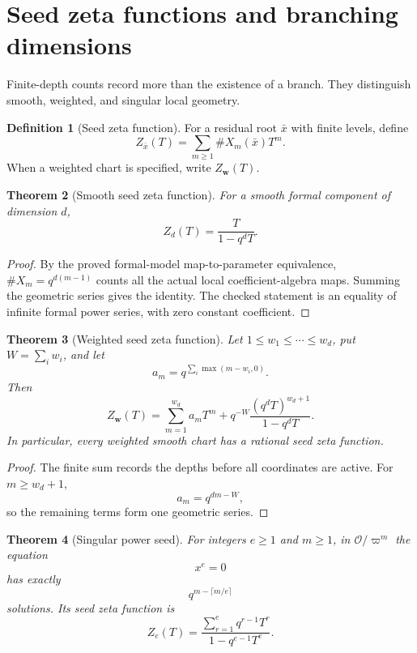 \documentclass[11pt]{article}
\newtheorem{theorem}{Theorem}[section]
\theoremstyle{definition}
\newtheorem{definition}[theorem]{Definition}
\theoremstyle{remark}
\newcommand{\Ocal}{\mathcal O}
\begin{document}
\section{Seed zeta functions and branching dimensions}

Finite-depth counts record more than the existence of a branch.  They distinguish smooth, weighted, and singular local geometry.

\begin{definition}[Seed zeta function]
For a residual root \(\bar x\) with finite levels, define
\[
\boxed{
Z_{\bar x}(T)
=
\sum_{m\ge1}\#X_m(\bar x)T^m.
}
\]
When a weighted chart is specified, write \(Z_{\bm w}(T)\).
\end{definition}

\begin{theorem}[Smooth seed zeta function]
For a smooth formal component of dimension \(d\),
\[
\boxed{
Z_d(T)=\frac{T}{1-q^dT}.
}
\]
\end{theorem}

\begin{proof}
By the proved formal-model map-to-parameter equivalence, \(\#X_m=q^{d(m-1)}\) counts all the actual local coefficient-algebra maps. Summing the geometric series gives the identity. The checked statement is an equality of infinite formal power series, with zero constant coefficient.
\end{proof}

\begin{theorem}[Weighted seed zeta function]
Let \(1\le w_1\le\cdots\le w_d\), put \(W=\sum_iw_i\), and let
\[
a_m=q^{\sum_i\max(m-w_i,0)}.
\]
Then
\[
\boxed{
Z_{\bm w}(T)
=
\sum_{m=1}^{w_d}a_mT^m
+
q^{-W}\frac{(q^dT)^{w_d+1}}{1-q^dT}.
}
\]
In particular, every weighted smooth chart has a rational seed zeta function.
\end{theorem}

\begin{proof}
The finite sum records the depths before all coordinates are active.  For \(m\ge w_d+1\),
\[
a_m=q^{dm-W},
\]
so the remaining terms form one geometric series.
\end{proof}

\begin{theorem}[Singular power seed]
For integers \(e\ge1\) and \(m\ge1\), in \(\Ocal/\varpi^m\) the equation
\[
x^e=0
\]
has exactly
\[
\boxed{
q^{m-\lceil m/e\rceil}
}
\]
solutions.  Its seed zeta function is
\[
\boxed{
Z_e(T)
=
\frac{\sum_{r=1}^{e}q^{r-1}T^r}
{1-q^{e-1}T^e}.
}
\]
\end{theorem}
\end{document}
